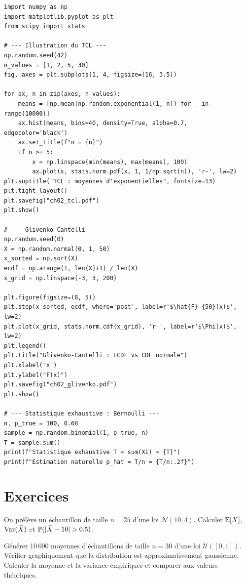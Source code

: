 \begin{python}
\begin{verbatim}
import numpy as np
import matplotlib.pyplot as plt
from scipy import stats

# --- Illustration du TCL ---
np.random.seed(42)
n_values = [1, 2, 5, 30]
fig, axes = plt.subplots(1, 4, figsize=(16, 3.5))

for ax, n in zip(axes, n_values):
    means = [np.mean(np.random.exponential(1, n)) for _ in range(10000)]
    ax.hist(means, bins=40, density=True, alpha=0.7, edgecolor='black')
    ax.set_title(f"n = {n}")
    if n >= 5:
        x = np.linspace(min(means), max(means), 100)
        ax.plot(x, stats.norm.pdf(x, 1, 1/np.sqrt(n)), 'r-', lw=2)
plt.suptitle("TCL : moyennes d'exponentielles", fontsize=13)
plt.tight_layout()
plt.savefig("ch02_tcl.pdf")
plt.show()

# --- Glivenko-Cantelli ---
np.random.seed(0)
X = np.random.normal(0, 1, 50)
x_sorted = np.sort(X)
ecdf = np.arange(1, len(X)+1) / len(X)
x_grid = np.linspace(-3, 3, 200)

plt.figure(figsize=(8, 5))
plt.step(x_sorted, ecdf, where='post', label=r'$\hat{F}_{50}(x)$', lw=2)
plt.plot(x_grid, stats.norm.cdf(x_grid), 'r-', label=r'$\Phi(x)$', lw=2)
plt.legend()
plt.title("Glivenko-Cantelli : ECDF vs CDF normale")
plt.xlabel("x")
plt.ylabel("F(x)")
plt.savefig("ch02_glivenko.pdf")
plt.show()

# --- Statistique exhaustive : Bernoulli ---
n, p_true = 100, 0.68
sample = np.random.binomial(1, p_true, n)
T = sample.sum()
print(f"Statistique exhaustive T = sum(Xi) = {T}")
print(f"Estimation naturelle p_hat = T/n = {T/n:.2f}")
\end{verbatim}
\end{python}

\section{Exercices}

\begin{exercice}
On pr\'el\`eve un \'echantillon de taille $n=25$ d'une loi $\mathcal{N}(10,4)$. Calculer $\mathbb{E}[\bar{X}]$, $\operatorname{Var}(\bar{X})$ et $\Prob(|\xbar-10|>0.5)$.
\end{exercice}

\begin{exercice}
G\'en\'erer 10\,000 moyennes d'\'echantillons de taille $n=30$ d'une loi $\mathcal{U}([0,1])$. V\'erifier graphiquement que la distribution est approximativement gaussienne. Calculer la moyenne et la variance empiriques et comparer aux valeurs th\'eoriques.
\end{exercice}

